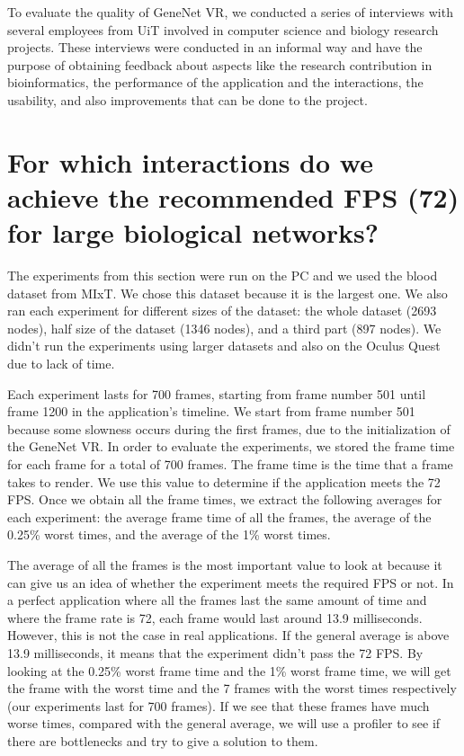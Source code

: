 
To evaluate the quality of GeneNet VR, we conducted a series of interviews with several employees from UiT involved in computer science and biology research projects. These interviews were conducted in an informal way and have the purpose of obtaining feedback about aspects like the research contribution in bioinformatics, the performance of the application and the interactions, the usability, and also improvements that can be done to the project.

\section{For which interactions do we achieve the recommended FPS (72) for large biological networks?}


The experiments from this section were run on the PC and we used the blood dataset from MIxT. We chose this dataset because it is the largest one. We also ran each experiment for different sizes of the dataset: the whole dataset (2693 nodes), half size of the dataset (1346 nodes), and a third part (897 nodes). We didn't run the experiments using larger datasets and also on the Oculus Quest due to lack of time.

Each experiment lasts for 700 frames, starting from frame number 501 until frame 1200 in the application's timeline. We start from frame number 501 because some slowness occurs during the first frames, due to the initialization of the GeneNet VR. In order to evaluate the experiments, we stored the frame time for each frame for a total of 700 frames. The frame time is the time that a frame takes to render. We use this value to determine if the application meets the 72 FPS. Once we obtain all the frame times, we extract the following averages for each experiment: the average frame time of all the frames, the average of the 0.25\% worst times, and the average of the 1\% worst times.

The average of all the frames is the most important value to look at because it can give us an idea of whether the experiment meets the required FPS or not. In a perfect application where all the frames last the same amount of time and where the frame rate is 72, each frame would last around 13.9 milliseconds. However, this is not the case in real applications. If the general average is above 13.9 milliseconds, it means that the experiment didn't pass the 72 FPS. By looking at the 0.25\% worst frame time and the 1\% worst frame time, we will get the frame with the worst time and the 7 frames with the worst times respectively (our experiments last for 700 frames). If we see that these frames have much worse times, compared with the general average, we will use a profiler to see if there are bottlenecks and try to give a solution to them.

